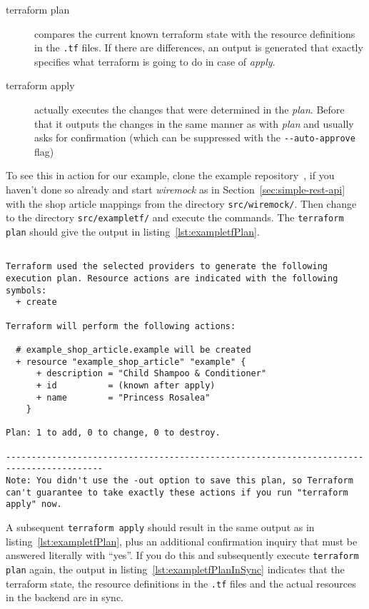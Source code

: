 \documentclass[paper=a4,11pt,numbers=noenddot]{article}
\begin{document}
\begin{description}
\item[terraform plan] compares the current known terraform state with the resource definitions in the \verb'.tf' files. If there are differences, an output is generated that exactly specifies what terraform is going to do in case of \emph{apply}.
\item[terraform apply] actually executes the changes that were determined in the \emph{plan}. Before that it outputs the changes in the same manner as with \emph{plan} and usually asks for confirmation (which can be suppressed with the \verb'--auto-approve' flag)
\end{description}

To see this in action for our example, clone the example repository~\cite{ecky-l_terraform-provider-example_nodate}, if you haven't done so already and start \emph{wiremock} as in Section~\ref{sec:simple-rest-api} with the shop article mappings from the directory \verb'src/wiremock/'. Then change to the directory \verb'src/exampletf/' and execute the commands. The \verb'terraform plan' should give the output in listing~\ref{lst:exampletfPlan}.

\begin{lstlisting}[label=lst:exampletfPlan]

Terraform used the selected providers to generate the following execution plan. Resource actions are indicated with the following symbols:
  + create

Terraform will perform the following actions:

  # example_shop_article.example will be created
  + resource "example_shop_article" "example" {
      + description = "Child Shampoo & Conditioner"
      + id          = (known after apply)
      + name        = "Princess Rosalea"
    }

Plan: 1 to add, 0 to change, 0 to destroy.

-----------------------------------------------------------------------------------------
Note: You didn't use the -out option to save this plan, so Terraform can't guarantee to take exactly these actions if you run "terraform apply" now.

\end{lstlisting}

A subsequent \verb'terraform apply' should result in the same output as in listing~\ref{lst:exampletfPlan}, plus an additional confirmation inquiry that must be answered literally with ``yes''. If you do this and subsequently execute \verb'terraform plan' again, the output in listing~\ref{lst:exampletfPlanInSync} indicates that the terraform state, the resource definitions in the \verb'.tf' files and the actual resources in the backend are in sync.
\end{document}
